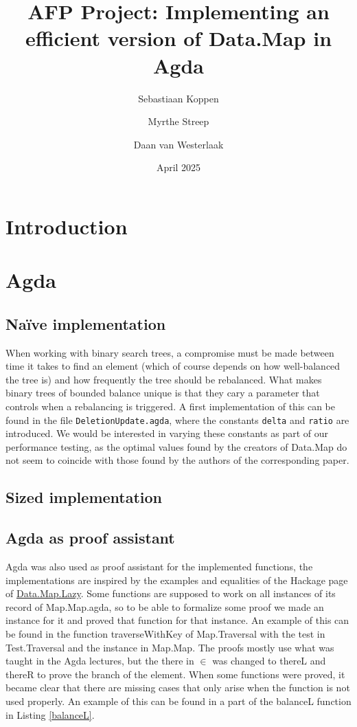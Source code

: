 \documentclass[a4paper,UKenglish,cleveref, autoref, thm-restate]{template/lipics-v2021}
\title{AFP Project: Implementing an efficient version of Data.Map in Agda}
\author{Sebastiaan Koppen}{Utrecht University, Netherlands}{}{}{}
\author{Myrthe Streep}{Utrecht University, Netherlands}{}{}{}
\author{Daan van Westerlaak}{Utrecht University, Netherlands}{}{}{}
\date{April 2025}
\begin{document}
\maketitle

\section*{Introduction}

\section*{Agda}
\subsection*{Na\"ive implementation}
When working with binary search trees, a compromise must be made between time it takes to find an element (which of course depends on how well-balanced the tree is) and how frequently the tree should be rebalanced. What makes binary trees of bounded balance unique is that they cary a parameter that controls when a rebalancing is triggered. A first implementation of this can be found in the file \texttt{DeletionUpdate.agda}, where the constants \texttt{delta} and \texttt{ratio} are introduced. We would be interested in varying these constants as part of our performance testing, as the optimal values found by the creators of Data.Map do not seem to coincide with those found by the authors of the corresponding paper.

\subsection*{Sized implementation}

\subsection*{Agda as proof assistant}
Agda was also used as proof assistant for the implemented functions, the implementations are inspired by the examples and equalities of the Hackage page of \href{https://hackage.haskell.org/package/containers-0.8/docs/Data-Map-Lazy.html}{Data.Map.Lazy}. 
Some functions are supposed to work on all instances of its record of Map.Map.agda, so to be able to formalize some proof we made an instance for it and proved that function for that instance. An example of this can be found in the function traverseWithKey of Map.Traversal with the test in Test.Traversal and the instance in Map.Map.
The proofs mostly use what was taught in the Agda lectures, but the there in $\in$ was changed to thereL and thereR to prove the branch of the element.
When some functions were proved, it became clear that there are missing cases that only arise when the function is not used properly. An example of this can be found in a part of the balanceL function in Listing \ref{balanceL}.
\end{document}
